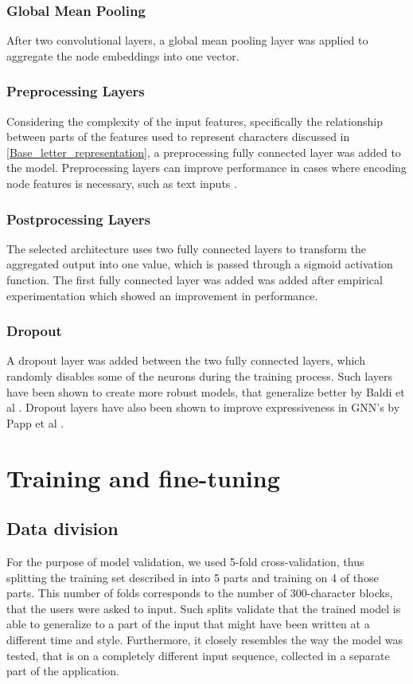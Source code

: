 \subsubsection{Global Mean Pooling}
After two convolutional layers, a global mean pooling layer was applied to aggregate the node embeddings into one vector. 


\subsubsection{Preprocessing Layers}
Considering the complexity of the input features, specifically the relationship between parts of the features used to represent characters discussed in \ref{Base_letter_representation}, a preprocessing fully connected layer was added to the model. Preprocessing layers can improve performance in cases where encoding node features is necessary, such as text inputs \cite{Lesk2024}.

\subsubsection{Postprocessing Layers}
The selected architecture uses two fully connected layers to transform the aggregated output into one value, 
which is passed through a sigmoid activation function. The first fully connected layer was added was added after empirical experimentation which showed an improvement in performance.


\subsubsection{Dropout}
A dropout layer was added between the two fully connected layers, which randomly disables some of the neurons during the training process. Such layers have been shown to create more robust models, that generalize better by Baldi et al \cite{NIPS2013_71f6278d}. Dropout layers have also been shown to improve expressiveness in GNN's by Papp et al \cite{NEURIPS2021_b8b2926b}.

\section{Training and fine-tuning}

\subsection{Data division}
For the purpose of model validation, we used 5-fold cross-validation, thus splitting the training set described in  into 5 parts and training on 4 of those parts. This number of folds corresponds to the number of 300-character blocks, that the users were asked to input. Such splits validate that the trained model is able to generalize to a part of the input that might have been written at a different time and style. Furthermore, it closely resembles the way the model was tested, that is on a completely different input sequence, collected in a separate part of the application.  

